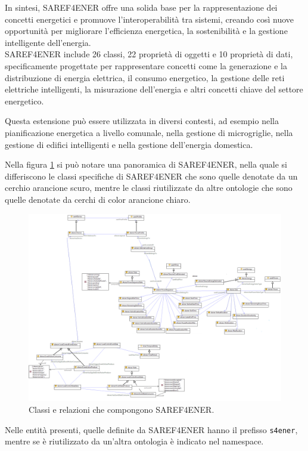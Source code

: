 In sintesi, SAREF4ENER offre una solida base per la rappresentazione dei
concetti energetici e promuove l'interoperabilità tra sistemi, creando così
nuove opportunità per migliorare l'efficienza energetica, la sostenibilità e la
gestione intelligente dell'energia.\\

SAREF4ENER include 26 classi, 22 proprietà di oggetti e 10 proprietà di dati,
specificamente progettate per rappresentare concetti come la generazione e la
distribuzione di energia elettrica, il consumo energetico, la gestione delle
reti elettriche intelligenti, la misurazione dell'energia e altri concetti
chiave del settore energetico.

Questa estensione può essere utilizzata in diversi contesti, ad esempio nella
pianificazione energetica a livello comunale, nella gestione di microgriglie,
nella gestione di edifici intelligenti e nella gestione dell'energia domestica.

Nella figura \ref{fig:saref4ener} si può notare una panoramica di SAREF4ENER,
nella quale si differiscono le classi specifiche di SAREF4ENER che sono quelle
denotate da un cerchio arancione scuro, mentre le classi riutilizzate da altre
ontologie che sono quelle denotate da cerchi di color arancione chiaro.
\begin{figure}[!ht]
      \centering
      \includegraphics[width=15cm]{figures/saref4ener.png}
      \caption{Classi e relazioni che compongono SAREF4ENER.}
      \label{fig:saref4ener}
\end{figure}

Nelle entità presenti, quelle definite da SAREF4ENER hanno il prefisso
\texttt{s4ener}, mentre se è riutilizzato da un'altra ontologia è indicato nel
namespace.

